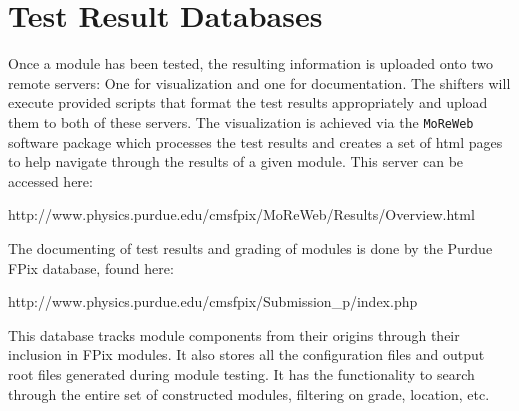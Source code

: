 \section{Test Result Databases}
\label{s:uploading}



Once a module has been tested, the resulting information is uploaded onto two remote servers:
One for visualization and one for documentation.
The shifters will execute provided scripts that format the test results appropriately 
and upload them to both of these servers.
The visualization is achieved via the {\tt MoReWeb} software package which processes the test results
and creates a set of html pages to help navigate through the results of a given module.
This server can be accessed here: 
\begin{center}
http://www.physics.purdue.edu/cmsfpix/MoReWeb/Results/Overview.html
\end{center}
The documenting of test results and grading of modules is done by the Purdue FPix database, found here: 
\begin{center}
http://www.physics.purdue.edu/cmsfpix/Submission\_p/index.php
\end{center}
This database tracks module components from their origins through their inclusion in FPix modules.
It also stores all the configuration files and output root files generated during module testing.  
It has the functionality to search through the entire set of constructed modules, filtering on grade, location, etc.


